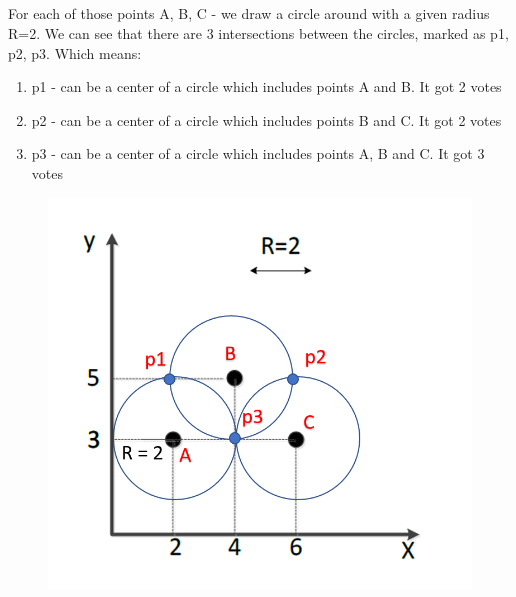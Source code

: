 \documentclass[a4paper]{iacas}
\begin{document}
\subsection{}
For each of those points A, B, C - we draw a circle around with a given radius R=2. We can see that there are 3 intersections between the circles, marked as p1, p2, p3. Which means:
\begin{enumerate}
\item p1 - can be a center of a circle which includes points A and B. It got 2 votes
\item p2 - can be a center of a circle which includes points B and C. It got 2 votes
\item p3 - can be a center of a circle which includes points A, B and C. It got 3 votes
\end{enumerate}

\begin{figure}[h!]
\includegraphics[scale=0.7]{imgs/q1_3.png}
\end{figure}
\end{document}
